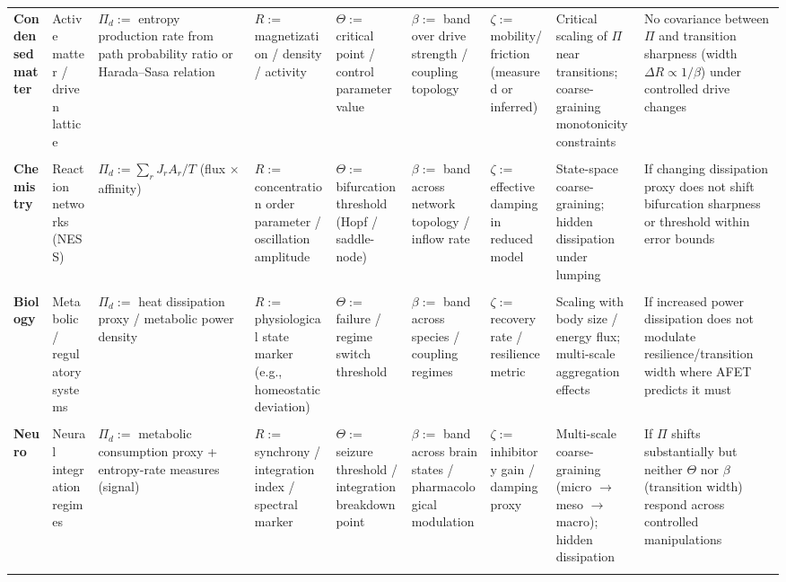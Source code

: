 \begin{longtable}{p{2.3cm} p{2.6cm} p{3.0cm} p{2.6cm} p{2.2cm} p{2.3cm} p{2.2cm} p{2.6cm} p{3.2cm}}
\textbf{Condensed matter} &
Active matter / driven lattice &
$\Pi_d :=$ entropy production rate from path probability ratio or Harada--Sasa relation &
$R :=$ magnetization / density / activity &
$\Theta :=$ critical point / control parameter value &
$\beta :=$ band over drive strength / coupling topology &
$\zeta :=$ mobility/friction (measured or inferred) &
Critical scaling of $\Pi$ near transitions; coarse-graining monotonicity constraints &
No covariance between $\Pi$ and transition sharpness (width $\Delta R \propto 1/\beta$) under controlled drive changes \\
\\

\textbf{Chemistry} &
Reaction networks (NESS) &
$\Pi_d := \sum_r J_r A_r / T$ (flux $\times$ affinity) &
$R :=$ concentration order parameter / oscillation amplitude &
$\Theta :=$ bifurcation threshold (Hopf / saddle-node) &
$\beta :=$ band across network topology / inflow rate &
$\zeta :=$ effective damping in reduced model &
State-space coarse-graining; hidden dissipation under lumping &
If changing dissipation proxy does not shift bifurcation sharpness or threshold within error bounds \\
\\

\textbf{Biology} &
Metabolic / regulatory systems &
$\Pi_d :=$ heat dissipation proxy / metabolic power density &
$R :=$ physiological state marker (e.g., homeostatic deviation) &
$\Theta :=$ failure / regime switch threshold &
$\beta :=$ band across species / coupling regimes &
$\zeta :=$ recovery rate / resilience metric &
Scaling with body size / energy flux; multi-scale aggregation effects &
If increased power dissipation does not modulate resilience/transition width where AFET predicts it must \\
\\

\textbf{Neuro} &
Neural integration regimes &
$\Pi_d :=$ metabolic consumption proxy + entropy-rate measures (signal) &
$R :=$ synchrony / integration index / spectral marker &
$\Theta :=$ seizure threshold / integration breakdown point &
$\beta :=$ band across brain states / pharmacological modulation &
$\zeta :=$ inhibitory gain / damping proxy &
Multi-scale coarse-graining (micro $\to$ meso $\to$ macro); hidden dissipation &
If $\Pi$ shifts substantially but neither $\Theta$ nor $\beta$ (transition width) respond across controlled manipulations \\
\\


\end{longtable}
